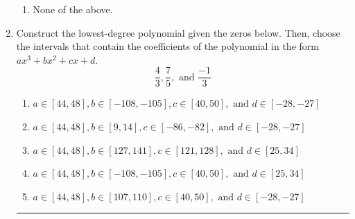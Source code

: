 \documentclass[14pt]{extbook}
\newcommand{\litem}[1]{\item#1\hspace*{-1cm}\rule{\textwidth}{0.4pt}}
\begin{document}
\begin{enumerate}
{\begin{enumerate}[label=\Alph*.]
\item None of the above.
\end{enumerate} }
\litem{
Construct the lowest-degree polynomial given the zeros below. Then, choose the intervals that contain the coefficients of the polynomial in the form $ax^3+bx^2+cx+d$.\[ \frac{4}{3}, \frac{7}{5}, \text{ and } \frac{-1}{3} \]\begin{enumerate}[label=\Alph*.]
\item \( a \in [44, 48], b \in [-108, -105], c \in [40, 50], \text{ and } d \in [-28, -27] \)
\item \( a \in [44, 48], b \in [9, 14], c \in [-86, -82], \text{ and } d \in [-28, -27] \)
\item \( a \in [44, 48], b \in [127, 141], c \in [121, 128], \text{ and } d \in [25, 34] \)
\item \( a \in [44, 48], b \in [-108, -105], c \in [40, 50], \text{ and } d \in [25, 34] \)
\item \( a \in [44, 48], b \in [107, 110], c \in [40, 50], \text{ and } d \in [-28, -27] \)


\end{enumerate}}
\end{enumerate}
\end{document}
